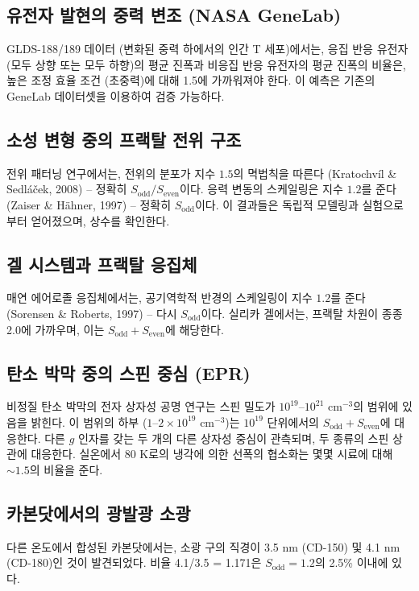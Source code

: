 \documentclass[11pt,a4paper]{article}
\begin{document}
	\subsection{유전자 발현의 중력 변조 (NASA GeneLab)}
	GLDS-188/189 데이터 (변화된 중력 하에서의 인간 T 세포)에서는, 응집 반응 유전자 (모두 상향 또는 모두 하향)의 평균 진폭과 비응집 반응 유전자의 평균 진폭의 비율은, 높은 조정 효율 조건 (초중력)에 대해 1.5에 가까워져야 한다. 이 예측은 기존의 GeneLab 데이터셋을 이용하여 검증 가능하다.
	
	\subsection{소성 변형 중의 프랙탈 전위 구조}
	전위 패터닝 연구에서는, 전위의 분포가 지수 \(1.5\)의 멱법칙을 따른다 (Kratochv\'il \& Sedl\'a\v{c}ek, 2008) -- 정확히 \(S_{\text{odd}}/S_{\text{even}}\)이다. 응력 변동의 스케일링은 지수 \(1.2\)를 준다 (Zaiser \& H\"ahner, 1997) -- 정확히 \(S_{\text{odd}}\)이다. 이 결과들은 독립적 모델링과 실험으로부터 얻어졌으며, 상수를 확인한다.
	
	\subsection{겔 시스템과 프랙탈 응집체}
	매연 에어로졸 응집체에서는, 공기역학적 반경의 스케일링이 지수 \(1.2\)를 준다 (Sorensen \& Roberts, 1997) -- 다시 \(S_{\text{odd}}\)이다. 실리카 겔에서는, 프랙탈 차원이 종종 2.0에 가까우며, 이는 \(S_{\text{odd}}+S_{\text{even}}\)에 해당한다.
	
	\subsection{탄소 박막 중의 스핀 중심 (EPR)}
	비정질 탄소 박막의 전자 상자성 공명 연구는 스핀 밀도가 \(10^{19}\)--\(10^{21}\) cm\({}^{-3}\)의 범위에 있음을 밝힌다. 이 범위의 하부 (\(1\)--\(2\times10^{19}\) cm\({}^{-3}\))는 \(10^{19}\) 단위에서의 \(S_{\text{odd}}+S_{\text{even}}\)에 대응한다. 다른 \(g\) 인자를 갖는 두 개의 다른 상자성 중심이 관측되며, 두 종류의 스핀 상관에 대응한다. 실온에서 80 K로의 냉각에 의한 선폭의 협소화는 몇몇 시료에 대해 \(\sim 1.5\)의 비율을 준다.
	
	\subsection{카본닷에서의 광발광 소광}
	다른 온도에서 합성된 카본닷에서는, 소광 구의 직경이 3.5 nm (CD-150) 및 4.1 nm (CD-180)인 것이 발견되었다. 비율 4.1/3.5 = 1.171은 \(S_{\text{odd}}=1.2\)의 2.5\% 이내에 있다.
	
\end{document}
